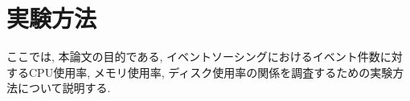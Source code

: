 \documentclass[../../main]{subfiles}
\begin{document}
    \section{実験方法}\label{sec:method}

    ここでは, 本論文の目的である, イベントソーシングにおけるイベント件数に対するCPU使用率, メモリ使用率, ディスク使用率の関係を調査するための実験方法について説明する.

    

    

    

    

    
\end{document}
